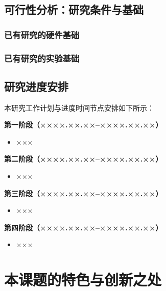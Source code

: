 \subsection{可行性分析：研究条件与基础}
\subsubsection{已有研究的硬件基础}
\subsubsection{已有研究的实验基础}

\subsection{研究进度安排}
本研究工作计划与进度时间节点安排如下所示：

\textbf{第一阶段（××××.××.××--××××.××.××）}
\begin{itemize}
	\item ×××
\end{itemize}

\textbf{第二阶段（××××.××.××--××××.××.××）}
\begin{itemize}
	\item ×××
\end{itemize}

\textbf{第三阶段（××××.××.××--××××.××.××）}
\begin{itemize}
	\item ×××
\end{itemize}

\textbf{第四阶段（××××.××.××--××××.××.××）}
\begin{itemize}
	\item ×××
\end{itemize}


\section{本课题的特色与创新之处}
%

